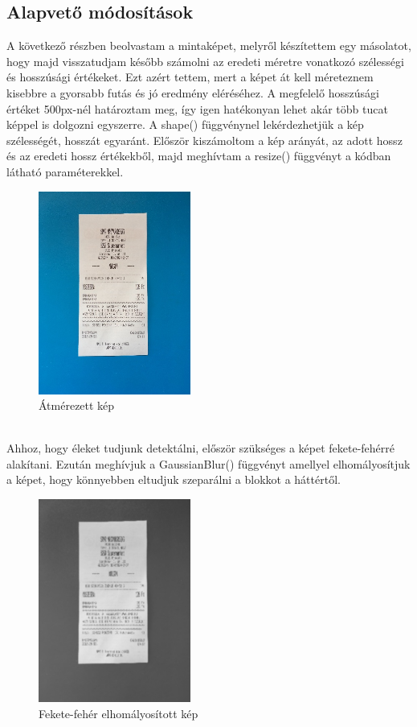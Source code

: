 \documentclass[a4paper,12pt]{article}
\begin{document}
\subsection{Alapvető módosítások}
A következő részben beolvastam a mintaképet, melyről készítettem egy másolatot, hogy majd visszatudjam később számolni az eredeti méretre vonatkozó szélességi és hosszúsági értékeket. Ezt azért tettem, mert a képet át kell méreteznem kisebbre a gyorsabb futás és jó eredmény eléréséhez. A megfelelő hosszúsági értéket 500px-nél határoztam meg, így igen hatékonyan lehet akár több tucat képpel is dolgozni egyszerre. A shape() függvénynel lekérdezhetjük a kép szélességét, hosszát egyaránt. Először kiszámoltom a kép arányát, az adott hossz és az eredeti hossz értékekből, majd meghívtam a resize() függvényt a kódban látható paraméterekkel.
\begin{figure}[h]
	\centering
	\includegraphics[width=5cm]{1d_resized}
	\caption{Átmérezett kép}
\end{figure}
\\Ahhoz, hogy éleket tudjunk detektálni, először szükséges a képet fekete-fehérré alakítani. Ezután meghívjuk a GaussianBlur() függvényt amellyel elhomályosítjuk a képet, hogy könnyebben eltudjuk szeparálni a blokkot a háttértől. 
\begin{figure}[h]
	\centering
	\includegraphics[width=5cm]{3d_blur}
	\caption{Fekete-fehér elhomályosított kép}
\end{figure}
\end{document}
